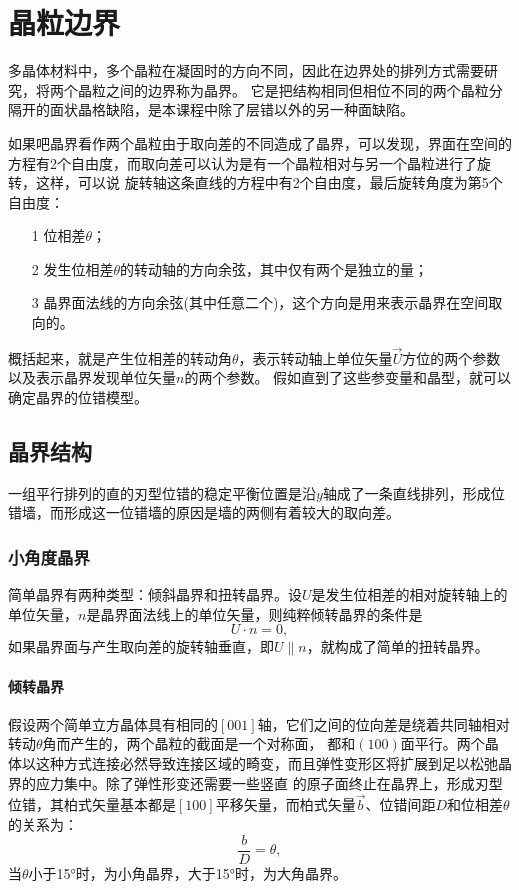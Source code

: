 \chapter{晶粒边界}
    多晶体材料中，多个晶粒在凝固时的方向不同，因此在边界处的排列方式需要研究，将两个晶粒之间的边界称为晶界。
    它是把结构相同但相位不同的两个晶粒分隔开的面状晶格缺陷，是本课程中除了层错以外的另一种面缺陷。

    如果吧晶界看作两个晶粒由于取向差的不同造成了晶界，可以发现，界面在空间的方程有2个自由度，而取向差可以认为是有一个晶粒相对与另一个晶粒进行了旋转，这样，可以说
    旋转轴这条直线的方程中有2个自由度，最后旋转角度为第5个自由度：
    \begin{itemize}
        \item[1] 位相差$\theta$；
        \item[2] 发生位相差$\theta$的转动轴的方向余弦，其中仅有两个是独立的量；
        \item[3]  晶界面法线的方向余弦(其中任意二个)，这个方向是用来表示晶界在空间取向的。 
    \end{itemize}
    概括起来，就是产生位相差的转动角$\theta$，表示转动轴上单位矢量$\vec{U}$方位的两个参数以及表示晶界发现单位矢量$n$的两个参数。
    假如直到了这些参变量和晶型，就可以确定晶界的位错模型。
    \section{晶界结构}
        一组平行排列的直的刃型位错的稳定平衡位置是沿$y$轴成了一条直线排列，形成位错墙，而形成这一位错墙的原因是墙的两侧有着较大的取向差。
        \subsection{小角度晶界}
            简单晶界有两种类型：倾斜晶界和扭转晶界。设$U$是发生位相差的相对旋转轴上的单位矢量，$n$是晶界面法线上的单位矢量，则纯粹倾转晶界的条件是    
            \begin{equation}
                U\cdot n=0,
            \end{equation}
            如果晶界面与产生取向差的旋转轴垂直，即$U\parallel n$，就构成了简单的扭转晶界。
            \subsubsection{倾转晶界}
                假设两个简单立方晶体具有相同的$[001]$轴，它们之间的位向差是绕着共同轴相对转动$\theta$角而产生的，两个晶粒的截面是一个对称面，
                都和$(100)$面平行。两个晶体以这种方式连接必然导致连接区域的畸变，而且弹性变形区将扩展到足以松弛晶界的应力集中。除了弹性形变还需要一些竖直
                的原子面终止在晶界上，形成刃型位错，其柏式矢量基本都是$[100]$平移矢量，而柏式矢量$\vec{b}$、位错间距$D$和位相差$\theta$的关系为：
                \begin{equation}
                    \frac{b}{D}=\theta,
                \end{equation}
                当$\theta$小于\ang{15}时，为小角晶界，大于\ang{15}时，为大角晶界。
